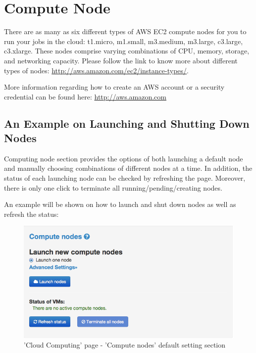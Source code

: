 \section{Compute Node}
There are as many as six different types of AWS EC2 compute nodes for you to run your jobs in the cloud: t1.micro, m1.small, m3.medium, m3.large, c3.large, c3.xlarge. These nodes comprise varying combinations of CPU, memory, storage, and networking capacity. Please follow the link to know more about different types of nodes: \url{http://aws.amazon.com/ec2/instance-types/}.

More information regarding how to create an AWS account or a security credential can be found here: \url{http://aws.amazon.com}

\subsection{An Example on Launching and Shutting Down Nodes}
Computing node section provides the options of both launching a default node and manually choosing combinations of different nodes at a time. In addition, the status of each launching node can be checked by refreshing the page. Moreover, there is only one click to terminate all running/pending/creating nodes.

An example will be shown on how to launch and shut down nodes as well as refresh the status:

\begin{figure}[!ht]
\centering
\includegraphics[scale=0.45]{T6/T6_fig_computenode1.png}
\caption{'Cloud Computing' page - 'Compute nodes' default setting section}
\label{fig:2}
\end{figure}

